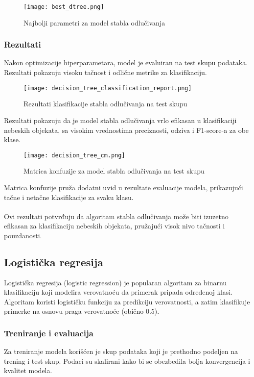 \documentclass[a4paper,12pt]{article}
\begin{document}
\begin{figure}[H]
\centering
\texttt{[image: best\_dtree.png]}
\caption{Najbolji parametri za model stabla odlučivanja}
\label{fig:best_dtree}
\end{figure}

\subsubsection{Rezultati}

Nakon optimizacije hiperparametara, model je evaluiran na test skupu podataka. Rezultati pokazuju visoku tačnost i odlične metrike za klasifikaciju.

\begin{figure}[H]
\centering
\texttt{[image: decision\_tree\_classification\_report.png]}
\caption{Rezultati klasifikacije stabla odlučivanja na test skupu}
\label{fig:decision_tree_classification_report}
\end{figure}

Rezultati pokazuju da je model stabla odlučivanja vrlo efikasan u klasifikaciji nebeskih objekata, sa visokim vrednostima preciznosti, odziva i F1-score-a za obe klase.

\begin{figure}[H]
\centering
\texttt{[image: decision\_tree\_cm.png]}
\caption{Matrica konfuzije za model stabla odlučivanja na test skupu}
\label{fig:decision_tree_cm}
\end{figure}

Matrica konfuzije pruža dodatni uvid u rezultate evaluacije modela, prikazujući tačne i netačne klasifikacije za svaku klasu.
\\\\Ovi rezultati potvrđuju da algoritam stabla odlučivanja može biti izuzetno efikasan za klasifikaciju nebeskih objekata, pružajući visok nivo tačnosti i pouzdanosti.

\newpage
\subsection{Logistička regresija}
Logistička regresija (logistic regression) je popularan algoritam za binarnu klasifikaciju koji modelira verovatnoću da primerak pripada određenoj klasi. Algoritam koristi logističku funkciju za predikciju verovatnosti, a zatim klasifikuje primerke na osnovu praga verovatnoće (obično 0.5).

\subsubsection{Treniranje i evaluacija}
Za treniranje modela korišćen je skup podataka koji je prethodno podeljen na trening i test skup. Podaci su skalirani kako bi se obezbedila bolja konvergencija i kvalitet modela.
\end{document}
